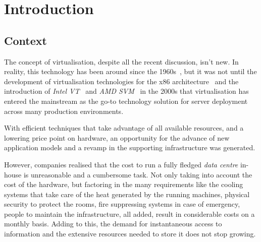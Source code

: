 \newcommand{\novathesis}{\emph{novathesis}}
\newcommand{\novathesisclass}{\texttt{novathesis.cls}}


\chapter{Introduction}
\label{cha:introduction}



\section{Context} %
\label{sec:context}

The concept of virtualisation, despite all the recent discussion, isn’t new. In reality, this technology has been around since the 1960s~\cite{Buzen1973}, but it was not until the development of virtualisation technologies for the x86 architecture~\cite{Agesen2010} and the introduction of \textit{Intel VT}~\cite{Intel2010} and \textit{AMD SVM}~\cite{AMD2010} in the 2000s that virtualisation has entered the mainstream as the go-to technology solution for server deployment across many production environments. 

With efficient techniques that take advantage of all available resources, and a lowering price point on hardware, an opportunity for the advance of new application models and a revamp in the supporting infrastructure was generated. 

However, companies realised that the cost to run a fully fledged \textit{data centre} in-house is unreasonable and a cumbersome task. Not only taking into account the cost of the hardware, but factoring in the many requirements like the cooling systems that take care of the heat generated by the running machines, physical security to protect the rooms, fire suppressing systems in case of emergency, people to maintain the infrastructure, all added, result in considerable costs on a monthly basis.
Adding to this, the demand for instantaneous access to information and the extensive resources needed to store it does not stop growing.

